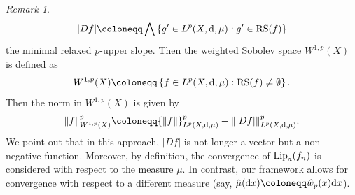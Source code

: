 \documentclass[11pt,leqno]{amsart}
\theoremstyle{remark}
\newtheorem{oss}[teo]{Remark}
\theoremstyle{definition}
\theoremstyle{definition}
\def\de{{\rm d}}
\newcommand{\norma}[1]{{\left\| #1\right\|}}
\begin{document}
\begin{oss}
\begin{align*}
\vert Df\vert\coloneqq \bigwedge \left\{g'\in L^{p}(X,{\rm d},\mu): g'\in {\rm RS}(f)\right\}
\end{align*}
the minimal relaxed $p$-upper slope. Then the weighted Sobolev space $W^{1,p}(X)$ is defined as
\begin{align*}
W^{1,p}(X)\coloneqq \left\{ f\in L^{p}(X,{\rm d},\mu): {\rm RS}(f)\neq \emptyset\right\}.
\end{align*}
Then the norm in  $W^{1,p}(X)$ is given by
\begin{align*}
\norma{f}_{W^{1,p}(X)}^{p}\coloneqq \norma{f}_{L^{p}(X,{\rm d},\mu)}^{p}+\norma{\vert Df\vert}_{L^{p}(X,{\rm d},\mu)}^{p}.
\end{align*}
We point out that in this approach, $\vert Df\vert$ is not longer a vector but a non-negative function. Moreover, by definition, the convergence of  ${\rm Lip}_{a}(f_{n})$ is considered with respect to the measure $\mu$. In contrast, our framework allows for convergence with respect to a different measure (say, $\hat{\mu}(\de x)\coloneqq \hat{w}_{p}(x)\de x$).
\end{oss}

\bigskip
\end{document}
